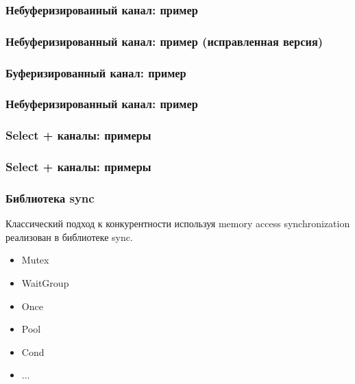 \documentclass[aspectratio=169]{beamer}
\begin{document}
\begin{frame}[fragile]
  \frametitle{Небуферизированный канал: пример}
  
  
  
\end{frame}

\begin{frame}[fragile]
  \frametitle{Небуферизированный канал: пример (исправленная версия)}
  
  
  
\end{frame}


\begin{frame}[fragile]
  \frametitle{Буферизированный канал: пример}
  
  
  
\end{frame}

\begin{frame}[fragile]
  \frametitle{Небуферизированный канал: пример}
  
  
  
\end{frame}

\begin{frame}[fragile]
  \frametitle{Select + каналы: примеры}
  
  
  
  
\end{frame}

\begin{frame}[fragile]
  \frametitle{Select + каналы: примеры}
  
  
  
\end{frame}

\begin{frame}[fragile]
	\frametitle{Библиотека sync}
	
	  Классический подход к конкурентности используя memory access synchronization реализован в библиотеке sync.

    \begin{itemize}
      \item Mutex
      \item WaitGroup
      \item Once
      \item Pool
      \item Cond 
      \item ...
    \end{itemize}

\end{frame}
\end{document}
